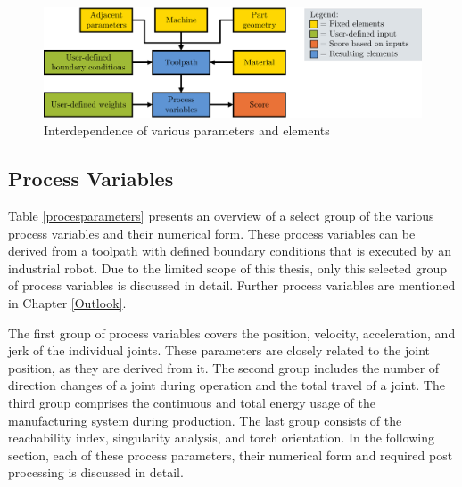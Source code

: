 \begin{figure}[H]
	\centerline{\includegraphics[width=1\textwidth]{figures/BasicScore.png}}
	\caption{Interdependence of various parameters and elements}
	\label{BasicScore}
\end{figure}





\subsection{Process Variables}\label{pp}


Table \ref{procesparameters} presents an overview of a select group of the various process variables and their numerical form. These process variables can be derived from a toolpath with defined boundary conditions that is executed by an industrial robot. Due to the limited scope of this thesis, only this selected group of process variables is discussed in detail. Further process variables are mentioned in Chapter \ref{Outlook}.

The first group of process variables covers the position, velocity, acceleration, and jerk of the individual joints. These parameters are closely related to the joint position, as they are derived from it. The second group includes the number of direction changes of a joint during operation and the total travel of a joint. The third group comprises the continuous and total energy usage of the manufacturing system during production. The last group consists of the reachability index, singularity analysis, and torch orientation. In the following section, each of these process parameters, their numerical form and required post processing is discussed in detail.

